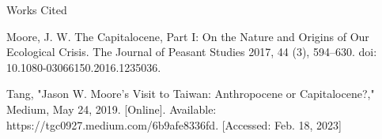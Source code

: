 \documentclass[12pt]{article}
\newcommand{\bibent}{\noindent \hangindent 40pt}
\newenvironment{workscited}{\newpage \begin{center} Works Cited \end{center}}{\newpage }
\begin{document}
\begin{flushleft}
\begin{workscited}

\bibent Moore, J. W. The Capitalocene, Part I: On the Nature and Origins of Our Ecological Crisis. The Journal of Peasant Studies 2017, 44 (3), 594–630. doi: 10.1080-03066150.2016.1235036.

\bibent 
 Tang, "Jason W. Moore's Visit to Taiwan: Anthropocene or Capitalocene?," Medium, May 24, 2019. [Online]. Available: https://tgc0927.medium.com/6b9afe8336fd. [Accessed: Feb. 18, 2023]



\end{workscited}

\end{flushleft}
\end{document}
